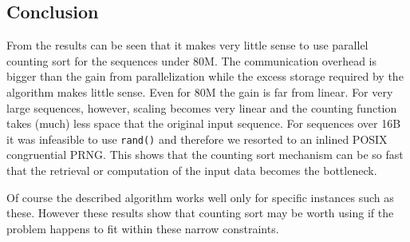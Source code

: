 \documentclass[10pt,a4paper]{article}
\begin{document}
\subsection{Conclusion}
From the results can be seen that it makes very little sense to use parallel counting sort for the sequences under 80M. The communication overhead is bigger than the gain from parallelization while the excess storage required by the algorithm makes little sense. Even for 80M the gain is far from linear. For very large sequences, however, scaling becomes very linear and the counting function takes (much) less space that the original input sequence. For sequences over 16B it was infeasible to use \texttt{rand()} and therefore we resorted to an inlined POSIX congruential PRNG. This shows that the counting sort mechanism can be so fast that the retrieval or computation of the input data becomes the bottleneck. 

Of course the described algorithm works well only for specific instances such as these. However these results show that counting sort may be worth using if the problem happens to fit within these narrow constraints.
\end{document}

